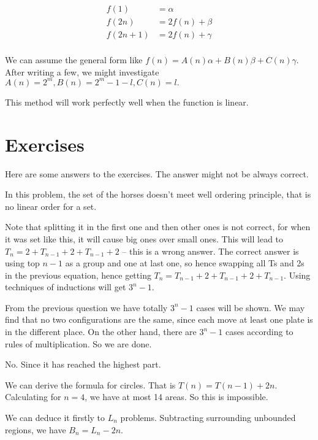 \begin{align*}
    f(1) &= \alpha \\
    f(2n) &= 2f(n)+\beta \\
    f(2n+1) &= 2f(n)+\gamma \\
\end{align*}

We can assume the general form like $f(n)=A(n)\alpha+B (n) \beta+C(n) \gamma$.
After writing a few, we might investigate $A(n)=2^m, B(n)=2^m-1-l, C(n)=l.$

This method will work perfectly well when the function is linear. 

\section{Exercises}

Here are some answers to the exercises. The answer might not be always correct. 

 In this problem, the set of the horses doesn't meet well ordering
principle, that is no linear order for a set. 

Note that splitting it in the first one and then other ones is not correct,
for when it was set like this, it will cause big ones over small ones. This
will lead to $T_n=2+T_{n-1}+2+T_{n-1}+2$ -- this is a wrong answer. The correct
answer is using top $n-1$ as a group and one at last one, so hence swapping all
Ts and 2s in the previous equation, hence getting
$T_n=T_{n-1}+2+T_{n-1}+2+T_{n-1}$. Using techniques of inductions will get
$3^n-1$. 

From the previous question we have totally $3^n-1$ cases will be shown. We may
find that no two configurations are the same, since each move at least one
plate is in the different place. On the other hand, there are $3^n-1$ cases
according to rules of multiplication. So we are done. 

No. Since it has reached the highest part. 

We can derive the formula for circles. That is $T(n)=T(n-1)+2n$. Calculating
for $n=4$, we have at most 14 areas. So this is impossible.   

We can deduce it firstly to $L_n$ problems. Subtracting surrounding unbounded
regions, we have $B_n = L_n -2n$. 


